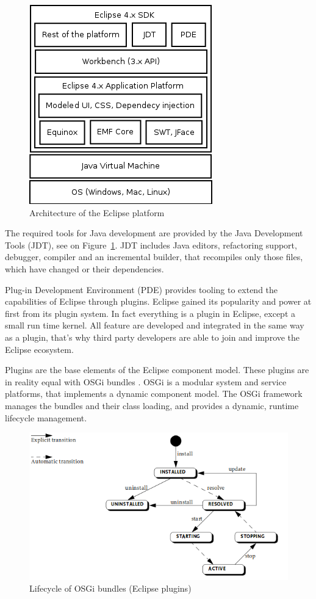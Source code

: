 \begin{figure}[htp]
\centering
\includegraphics[scale=0.5]{figures/design_eclipse.png}
\caption{Architecture of the Eclipse platform \cite{emf}}
\label{fig:designeclipse}
\end{figure}

The required tools for Java development are provided by the Java Development Tools (JDT), see on Figure~\ref{fig:designeclipse}. JDT includes Java editors, refactoring support, debugger, compiler and an incremental builder, that recompiles only those files, which have changed or their dependencies.

Plug-in Development Environment (PDE) provides tooling to extend the capabilities of Eclipse through plugins. Eclipse gained its popularity and power at first from its plugin system. In fact everything is a plugin in Eclipse, except a small run time kernel. All feature are developed and integrated in the same way as a plugin, that's why third party developers are able to join and improve the Eclipse ecosystem.

Plugins are the base elements of the Eclipse component model. These plugins are in reality equal with OSGi bundles \cite{osgi}. OSGi is a modular system and service platforms, that implements a dynamic component model. The OSGi framework manages the bundles and their class loading, and provides a dynamic, runtime lifecycle management.

\begin{figure}[htp]
\centering
\includegraphics[scale=0.5]{figures/design_osgi.png}
\caption{Lifecycle of OSGi bundles (Eclipse plugins) \cite{osgi}}
\label{fig:designosgi}
\end{figure}

